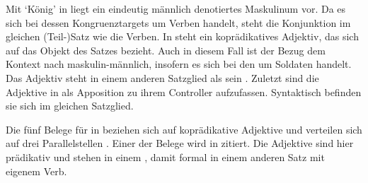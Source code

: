 
Mit  `König' in  liegt ein eindeutig
männlich denotiertes Maskulinum vor. Da es sich bei dessen
Kongruenztargets um Verben handelt, steht die Konjunktion im gleichen
(Teil-)Satz wie die Verben. In  steht ein
koprädikatives Adjektiv, das sich auf das Objekt des
Satzes bezieht. Auch in diesem Fall ist der Bezug dem Kontext
nach maskulin-männlich, insofern es sich bei den  um
Soldaten handelt. Das Adjektiv steht in einem anderen Satzglied als sein
. Zuletzt sind die Adjektive in 
als Apposition zu ihrem Controller aufzufassen. Syntaktisch
befinden sie sich im gleichen Satzglied.

Die fünf Belege für  in  beziehen sich auf
koprädikative Adjektive und verteilen sich auf drei
Parallelstellen%
. Einer der Belege wird in  zitiert. Die Adjektive sind
hier prädikativ und stehen in einem , damit formal in einem
anderen Satz mit eigenem Verb.

